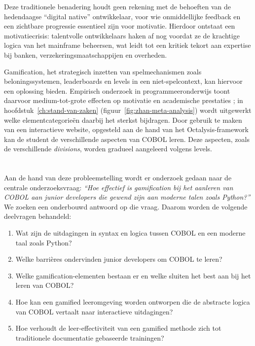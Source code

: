 Deze traditionele benadering houdt geen rekening met de behoeften van de hedendaagse \enquote{digital native} ontwikkelaar, 
voor wie onmiddellijke feedback en een zichtbare progressie essentieel zijn voor motivatie. 
Hierdoor ontstaat een motivatiecrisis: talentvolle ontwikkelaars haken af nog voordat ze de krachtige logica van het mainframe beheersen, wat leidt tot een kritiek tekort aan expertise bij banken, verzekeringsmaatschappijen en overheden.

Gamification, het strategisch inzetten van spelmechanismen zoals beloningssystemen, leaderboards en levels in een niet-\allowbreak spelcontext, kan hiervoor een oplossing bieden.
Empirisch onderzoek in programmeeronderwijs toont daarvoor medium-tot-grote effecten op motivatie en academische prestaties \autocite{Zhan2022}; in hoofdstuk~\ref{ch:stand-van-zaken} (figuur~\ref{fig:zhan-meta-analysis}) wordt uitgewerkt welke elementcategorieën daarbij het sterkst bijdragen.
Door gebruik te maken van een interactieve website, opgesteld aan de hand van het Octalysis-\allowbreak framework \autocite{Chou2015} kan de student de verschillende aspecten van COBOL leren. 
Deze aspecten, zoals de verschillende \textit{divisions}, worden gradueel aangeleerd volgens levels.

\section{}%
\label{sec:onderzoeksvraag}

Aan de hand van deze probleemstelling wordt er onderzoek gedaan naar de centrale onderzoeksvraag: 
\textit{\enquote{Hoe effectief is gamification bij het aanleren van COBOL aan junior developers die gewend zijn aan moderne talen zoals Python?}}\break
We zoeken een onderbouwd antwoord op die vraag. Daarom worden de volgende deelvragen behandeld:

\begin{enumerate}
    \item Wat zijn de uitdagingen in syntax en logica tussen COBOL en een moderne taal zoals Python?
    \item Welke barrières ondervinden junior developers om COBOL te leren?
    \item Welke gamification-elementen bestaan er en welke sluiten het best aan bij het leren van COBOL?
    \item Hoe kan een gamified leeromgeving worden ontworpen die de abstracte logica van COBOL vertaalt naar interactieve uitdagingen?
    \item Hoe verhoudt de leer-effectiviteit van een gamified methode zich tot traditionele documentatie gebaseerde trainingen?
\end{enumerate}

